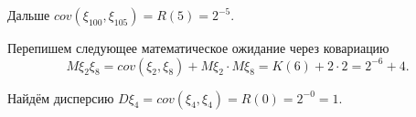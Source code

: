 Дальше $cov \left( \xi_{100}, \xi_{105} \right) = R \left( 5 \right) = 2^{-5}$.

Перепишем следующее математическое ожидание через ковариацию
\begin{equation*}
  M \xi_2 \xi_8 =
  cov \left( \xi_2, \xi_8 \right) + M \xi_2 \cdot M \xi_8 =
  K \left( 6 \right) + 2 \cdot 2 =
  2^{-6} + 4.
\end{equation*}

Найдём дисперсию $D \xi_4 = cov \left( \xi_4, \xi_4 \right) = R \left( 0 \right) = 2^{-0} = 1$.
